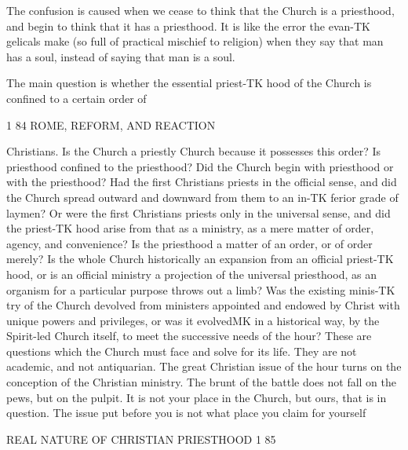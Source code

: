 \documentclass[12pt,a5paper,twoside]{book}
\begin{document}
{The confusion is caused when we cease to think 
that the Church is a priesthood, and begin to think 
that it has a priesthood. It is like the error the evan-TK
gelicals make (so full of practical mischief to religion) 
when they say that man has a soul, instead of saying 
that man is a soul. 

The main question is whether the essential priest-TK
hood of the Church is confined to a certain order of 



1 84 ROME, REFORM, AND REACTION 

Christians. Is the Church a priestly Church because 
it possesses this order? Is priesthood confined to the 
priesthood? Did the Church begin with priesthood 
or with the priesthood? Had the first Christians 
priests in the official sense, and did the Church 
spread outward and downward from them to an in-TK
ferior grade of laymen? Or were the first Christians 
priests only in the universal sense, and did the priest-TK
hood arise from that as a ministry, as a mere matter of 
order, agency, and convenience? Is the priesthood a 
matter of an order, or of order merely? Is the whole 
Church historically an expansion from an official priest-TK
hood, or is an official ministry a projection of the 
universal priesthood, as an organism for a particular 
purpose throws out a limb? Was the existing minis-TK
try of the Church devolved from ministers appointed 
and endowed by Christ with unique powers and 
privileges, or was it evolvedMK in a historical way, by the 
Spirit-led Church itself, to meet the successive needs of 
the hour? These are questions which the Church 
must face and solve for its life. They are not academic, 
and not antiquarian. The great Christian issue of 
the hour turns on the conception of the Christian 
ministry. The brunt of the battle does not fall on the 
pews, but on the pulpit. It is not your place in the 
Church, but ours, that is in question. The issue put 
before you is not what place you claim for yourself 



REAL NATURE OF CHRISTIAN PRIESTHOOD 1 85 

}
\end{document}
